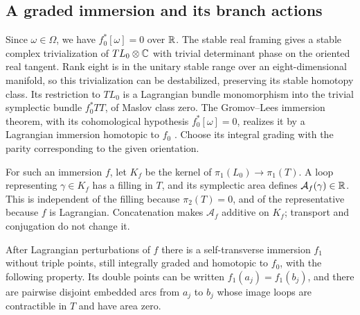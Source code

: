 \subsection{A graded immersion and its branch actions}

Since $\omega\in\Omega$, we have $f_0^*[\omega]=0$ over $\mathbb R$.
The stable real framing gives a stable complex trivialization of
$TL_0\otimes\mathbb C$ with trivial determinant phase on the oriented real
tangent.  Rank eight is in the unitary stable range over an
eight-dimensional manifold, so this trivialization can be
destabilized, preserving its stable homotopy class.  Its restriction
to $TL_0$ is a Lagrangian bundle monomorphism into the trivial
symplectic bundle $f_0^*TT$, of Maslov class zero.  The
Gromov--Lees immersion theorem, with its cohomological hypothesis
$f_0^*[\omega]=0$, realizes it by a Lagrangian immersion homotopic to
$f_0$ \cite[Theorem~2.3]{gromov-lees}.  Choose its integral grading
with the parity corresponding to the given orientation.

For such an immersion $f$, let $K_f$ be the kernel of
$\pi_1(L_0)\to\pi_1(T)$.  A loop representing $\gamma\in K_f$
has a filling in $T$, and its symplectic area defines
$\mathcal A_f(\gamma)\in\mathbb R$.  This is independent of the filling
because $\pi_2(T)=0$, and of the representative because $f$ is
Lagrangian.  Concatenation makes $\mathcal A_f$ additive on $K_f$;
transport and conjugation do not change it.

\begin{lemma}\label{top:zero-actions}
After Lagrangian perturbations of $f$ there is a self-transverse
immersion $f_1$ without triple points, still integrally graded and
homotopic to $f_0$, with the following property.  Its double points
can be written $f_1(a_j)=f_1(b_j)$, and there are pairwise disjoint
embedded arcs from $a_j$ to $b_j$ whose image loops are contractible
in $T$ and have area zero.
\end{lemma}


